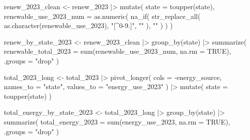 \documentclass[
  letterpaper,
  DIV=11,
  numbers=noendperiod]{scrartcl}
\newenvironment{Shaded}{\begin{snugshade}}{\end{snugshade}}
\newcommand{\AttributeTok}[1]{\textcolor[rgb]{0.40,0.45,0.13}{#1}}
\newcommand{\ConstantTok}[1]{\textcolor[rgb]{0.56,0.35,0.01}{#1}}
\newcommand{\FunctionTok}[1]{\textcolor[rgb]{0.28,0.35,0.67}{#1}}
\newcommand{\NormalTok}[1]{\textcolor[rgb]{0.00,0.23,0.31}{#1}}
\newcommand{\OtherTok}[1]{\textcolor[rgb]{0.00,0.23,0.31}{#1}}
\newcommand{\SpecialCharTok}[1]{\textcolor[rgb]{0.37,0.37,0.37}{#1}}
\newcommand{\StringTok}[1]{\textcolor[rgb]{0.13,0.47,0.30}{#1}}
\begin{document}
\begin{Shaded}
\begin{Highlighting}[]
\NormalTok{renew\_2023\_clean }\OtherTok{\textless{}{-}}
\NormalTok{  renew\_2023 }\SpecialCharTok{|\textgreater{}}
  \FunctionTok{mutate}\NormalTok{(}
    \AttributeTok{state =} \FunctionTok{toupper}\NormalTok{(state),}
    \AttributeTok{renewable\_use\_2023\_num =} \FunctionTok{as.numeric}\NormalTok{(}
      \FunctionTok{na\_if}\NormalTok{(}
        \FunctionTok{str\_replace\_all}\NormalTok{(}
          \FunctionTok{as.character}\NormalTok{(renewable\_use\_2023),}
          \StringTok{"[\^{}0{-}9.]"}\NormalTok{,}
          \StringTok{""}
\NormalTok{        ),}
        \StringTok{""}
\NormalTok{      )}
\NormalTok{    )}
\NormalTok{  )}

\NormalTok{renew\_by\_state\_2023 }\OtherTok{\textless{}{-}}
\NormalTok{  renew\_2023\_clean }\SpecialCharTok{|\textgreater{}}
  \FunctionTok{group\_by}\NormalTok{(state) }\SpecialCharTok{|\textgreater{}}
  \FunctionTok{summarize}\NormalTok{(}
    \AttributeTok{renewable\_total\_2023 =} \FunctionTok{sum}\NormalTok{(renewable\_use\_2023\_num, }\AttributeTok{na.rm =} \ConstantTok{TRUE}\NormalTok{),}
    \AttributeTok{.groups =} \StringTok{"drop"}
\NormalTok{  )}

\NormalTok{total\_2023\_long }\OtherTok{\textless{}{-}}
\NormalTok{  total\_2023 }\SpecialCharTok{|\textgreater{}}
  \FunctionTok{pivot\_longer}\NormalTok{(}
    \AttributeTok{cols =} \SpecialCharTok{{-}}\NormalTok{energy\_source,}
    \AttributeTok{names\_to =} \StringTok{"state"}\NormalTok{,}
    \AttributeTok{values\_to =} \StringTok{"energy\_use\_2023"}
\NormalTok{  ) }\SpecialCharTok{|\textgreater{}}
  \FunctionTok{mutate}\NormalTok{(}
    \AttributeTok{state =} \FunctionTok{toupper}\NormalTok{(state)}
\NormalTok{  )}

\NormalTok{total\_energy\_by\_state\_2023 }\OtherTok{\textless{}{-}}
\NormalTok{  total\_2023\_long }\SpecialCharTok{|\textgreater{}}
  \FunctionTok{group\_by}\NormalTok{(state) }\SpecialCharTok{|\textgreater{}}
  \FunctionTok{summarize}\NormalTok{(}
    \AttributeTok{total\_energy\_2023 =} \FunctionTok{sum}\NormalTok{(energy\_use\_2023, }\AttributeTok{na.rm =} \ConstantTok{TRUE}\NormalTok{),}
    \AttributeTok{.groups =} \StringTok{"drop"}
\NormalTok{  )}



\end{Highlighting}
\end{Shaded}
\end{document}
